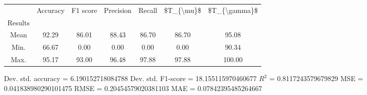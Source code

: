 \begin{tabular}{|c|c|c|c|c|c|c|}
\toprule
{} &  Accuracy &  F1 score &  Precision &  Recall &  \$T\_\{\textbackslash mu\}\$ &  \$T\_\{\textbackslash gamma\}\$ \\
Results &           &           &            &         &            &               \\
\hline
Mean    &     92.29 &     86.01 &      88.43 &   86.70 &      86.70 &         95.08 \\
Min.    &     66.67 &      0.00 &       0.00 &    0.00 &       0.00 &         90.34 \\
Max.    &     95.17 &     93.00 &      96.48 &   97.88 &      97.88 &        100.00 \\
\bottomrule
\end{tabular}

 Dev. std. accuracy = 6.190152718084788
 Dev. std. F1-score = 18.155115970460677
 $R^2$ = 0.8117243579679829
 MSE = 0.041838980290101475
 RMSE = 0.20454579020381103
 MAE = 0.07842395485264667